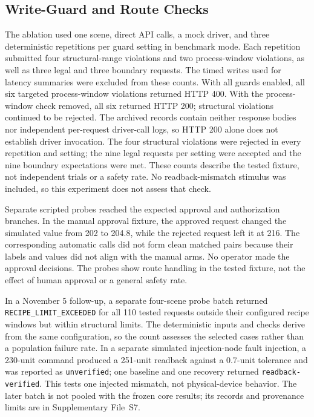 \subsection{Write-Guard and Route Checks}
\label{sec:eval-ablation}
The ablation used one scene, direct API calls, a mock driver, and three deterministic repetitions per guard setting in benchmark mode. Each repetition submitted four structural-range violations and two process-window violations, as well as three legal and three boundary requests. The timed writes used for latency summaries were excluded from these counts. With all guards enabled, all six targeted process-window violations returned HTTP 400. With the process-window check removed, all six returned HTTP 200; structural violations continued to be rejected. The archived records contain neither response bodies nor independent per-request driver-call logs, so HTTP 200 alone does not establish driver invocation. The four structural violations were rejected in every repetition and setting; the nine legal requests per setting were accepted and the nine boundary expectations were met. These counts describe the tested fixture, not independent trials or a safety rate. No readback-mismatch stimulus was included, so this experiment does not assess that check.

Separate scripted probes reached the expected approval and authorization branches. In the manual approval fixture, the approved request changed the simulated value from 202 to 204.8, while the rejected request left it at 216. The corresponding automatic calls did not form clean matched pairs because their labels and values did not align with the manual arms. No operator made the approval decisions. The probes show route handling in the tested fixture, not the effect of human approval or a general safety rate.

In a November 5 follow-up, a separate four-scene probe batch returned \texttt{RECIPE\_LIMIT\_EXCEEDED} for all 110 tested requests outside their configured recipe windows but within structural limits. The deterministic inputs and checks derive from the same configuration, so the count assesses the selected cases rather than a population failure rate. In a separate simulated injection-node fault injection, a 230-unit command produced a 251-unit readback against a 0.7-unit tolerance and was reported as \texttt{unverified}; one baseline and one recovery returned \texttt{readback-verified}. This tests one injected mismatch, not physical-device behavior. The later batch is not pooled with the frozen core results; its records and provenance limits are in Supplementary File~S7.

